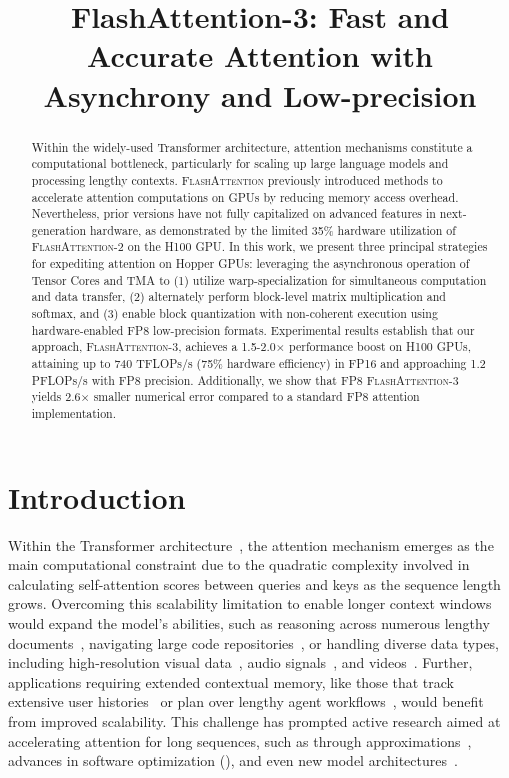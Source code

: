 \title{FlashAttention-3: Fast and Accurate Attention with Asynchrony and Low-precision}

\begin{abstract}
Within the widely-used Transformer architecture, attention mechanisms constitute a computational bottleneck, particularly for scaling up large language models and processing lengthy contexts. \textsc{FlashAttention} previously introduced methods to accelerate attention computations on GPUs by reducing memory access overhead. Nevertheless, prior versions have not fully capitalized on advanced features in next-generation hardware, as demonstrated by the limited 35\% hardware utilization of \textsc{FlashAttention-2} on the H100 GPU. In this work, we present three principal strategies for expediting attention on Hopper GPUs: leveraging the asynchronous operation of Tensor Cores and TMA to (1) utilize warp-specialization for simultaneous computation and data transfer, (2) alternately perform block-level matrix multiplication and softmax, and (3) enable block quantization with non-coherent execution using hardware-enabled FP8 low-precision formats. Experimental results establish that our approach, \textsc{FlashAttention-3}, achieves a 1.5-2.0$\times$ performance boost on H100 GPUs, attaining up to 740 TFLOPs/s (75\% hardware efficiency) in FP16 and approaching 1.2 PFLOPs/s with FP8 precision. Additionally, we show that FP8 \textsc{FlashAttention-3} yields 2.6$\times$ smaller numerical error compared to a standard FP8 attention implementation.
\end{abstract}

\section{Introduction}
\label{sec:intro}

Within the Transformer architecture~\citep{vaswani2017attention}, the attention mechanism emerges as the main computational constraint due to the quadratic complexity involved in calculating self-attention scores between queries and keys as the sequence length grows. Overcoming this scalability limitation to enable longer context windows would expand the model’s abilities, such as reasoning across numerous lengthy documents~\citep{guo2021longt5,shaham2022scrolls,peng2023yarn}, navigating large code repositories~\citep{roziere2023code, li2023starcoder}, or handling diverse data types, including high-resolution visual data~\citep{chen2022scaling}, audio signals~\citep{gulati2020conformer}, and videos~\citep{ho2022video}. Further, applications requiring extended contextual memory, like those that track extensive user histories~\citep{sun2019bert4rec} or plan over lengthy agent workflows~\citep{yao2022react}, would benefit from improved scalability. This challenge has prompted active research aimed at accelerating attention for long sequences, such as through approximations~\citep{katharopoulos2020transformers,choromanski2020rethinking,
tay2020efficient}, advances in software optimization (\citep{rabe2021self,dao2022flashattention,kwon2023efficient}), and even new model architectures~\citep{peng2023rwkv,sun2023retentive,gu2023mamba}.

